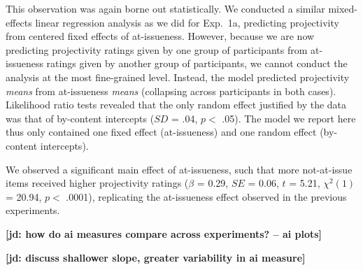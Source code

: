 \documentclass[11pt,fleqn]{article}
\newcommand{\6}{\mbox{$[\hspace*{-.6mm}[$}}
\newcommand{\9}{\mbox{$]\hspace*{-.6mm}]$}}
\newcommand{\jd}[1]{\textbf{\color{Green}[jd: #1]}}
\begin{document}
This observation was again borne out statistically. We conducted a similar mixed-effects linear regression analysis as we did for Exp.~1a, predicting projectivity from centered fixed effects of at-issueness. However, because we are now predicting projectivity ratings given by one group of participants from at-issueness ratings given by another group of participants, we cannot conduct the analysis at the most fine-grained level. Instead, the model predicted projectivity \emph{means}  from  at-issueness \emph{means} (collapsing across participants in both cases). Likelihood ratio tests revealed that the only random effect justified by the data was that of by-content intercepts ($SD$ = .04, $p < $ .05). The model we report here thus only contained one fixed effect (at-issueness) and one random effect (by-content intercepts).

We observed a significant main effect of at-issueness, such that more not-at-issue items received higher projectivity ratings ($\beta$ = 0.29, $SE$ = 0.06, $t$ = 5.21, $\chi^2(1)$ = 20.94, $p <$ .0001), replicating the at-issueness effect observed in the previous experiments.


\jd{how do ai measures compare across experiments? -- ai plots}

\jd{discuss shallower slope, greater variability in ai measure}
\end{document}

